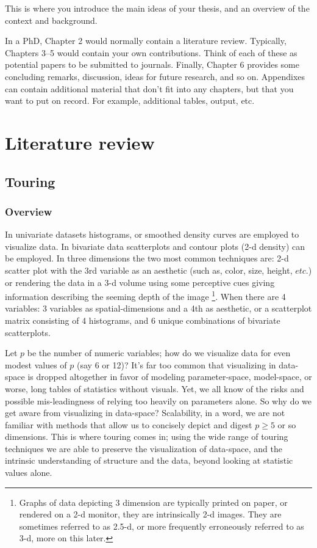 \documentclass{monashthesis}
\theoremstyle{definition}
\theoremstyle{definition}
\theoremstyle{definition}
\theoremstyle{remark}
\begin{document}
This is where you introduce the main ideas of your thesis, and an
overview of the context and background.

In a PhD, Chapter 2 would normally contain a literature review.
Typically, Chapters 3--5 would contain your own contributions. Think of
each of these as potential papers to be submitted to journals. Finally,
Chapter 6 provides some concluding remarks, discussion, ideas for future
research, and so on. Appendixes can contain additional material that
don't fit into any chapters, but that you want to put on record. For
example, additional tables, output, etc.

\chapter{Literature review}\label{ch:lit_review}

\section{Touring}\label{sec:tour}

\subsection{Overview}\label{overview}

In univariate datasets histograms, or smoothed density curves are
employed to visualize data. In bivariate data scatterplots and contour
plots (2-d density) can be employed. In three dimensions the two most
common techniques are: 2-d scatter plot with the 3rd variable as an
aesthetic (such as, color, size, height, \(etc.\)) or rendering the data
in a 3-d volume using some perceptive cues giving information describing
the seeming depth of the image
\footnote{Graphs of data depicting 3 dimension are typically printed on paper, or rendered on a 2-d monitor, they are intrinsically 2-d images. They are sometimes referred to as 2.5-d, or more frequently erroneously referred to as 3-d, more on this later.}.
When there are 4 variables: 3 variables as spatial-dimensions and a 4th
as aesthetic, or a scatterplot matrix consisting of 4 histograms, and 6
unique combinations of bivariate scatterplots.

Let \(p\) be the number of numeric variables; how do we visualize data
for even modest values of \(p\) (say 6 or 12)? It's far too common that
visualizing in data-space is dropped altogether in favor of modeling
parameter-space, model-space, or worse, long tables of statistics
without visuals\autocite{wickham_visualizing_2015}. Yet, we all know of
the risks and possible mis-leadingness of relying too heavily on
parameters alone\autocites{anscombe_graphs_1973}{matejka_same_2017}. So
why do we get aware from visualizing in data-space? Scalability, in a
word, we are not familiar with methods that allow us to concisely depict
and digest \(p \geq 5\) or so dimensions. This is where touring comes
in; using the wide range of touring techniques we are able to preserve
the visualization of data-space, and the intrinsic understanding of
structure and the data, beyond looking at statistic values alone.
\end{document}
